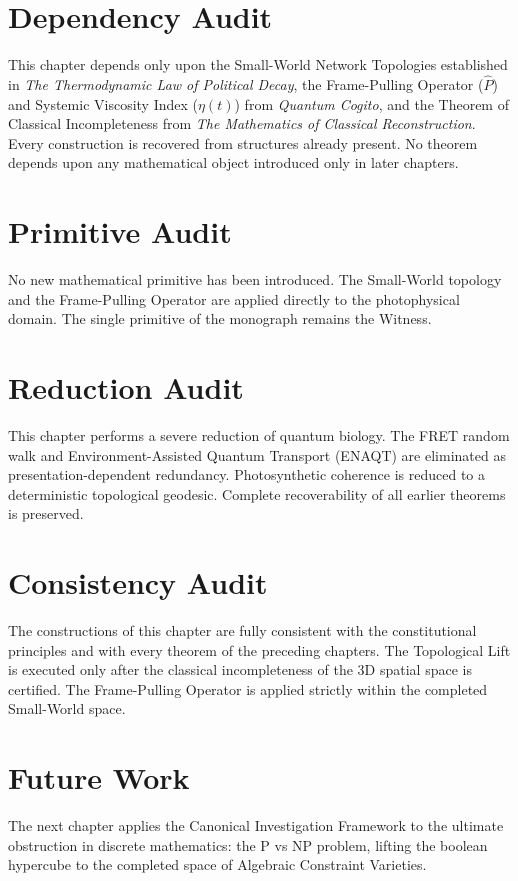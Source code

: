 \documentclass[11pt,openany]{extbook}
\newenvironment{dependencyaudit}{\section*{Dependency Audit}}{}
\newenvironment{primitiveaudit}{\section*{Primitive Audit}}{}
\newenvironment{reductionaudit}{\section*{Reduction Audit}}{}
\newenvironment{consistencyaudit}{\section*{Consistency Audit}}{}
\newenvironment{futurework}{\section*{Future Work}}{}
\theoremstyle{plain}
\theoremstyle{definition}
\begin{document}
\begin{dependencyaudit}
\noindent This chapter depends only upon the Small-World Network Topologies established in \textit{The Thermodynamic Law of Political Decay}, the Frame-Pulling Operator ($\hat{P}$) and Systemic Viscosity Index ($\eta(t)$) from \textit{Quantum Cogito}, and the Theorem of Classical Incompleteness from \textit{The Mathematics of Classical Reconstruction}. Every construction is recovered from structures already present. No theorem depends upon any mathematical object introduced only in later chapters.
\end{dependencyaudit}

\begin{primitiveaudit}
\noindent No new mathematical primitive has been introduced. The Small-World topology and the Frame-Pulling Operator are applied directly to the photophysical domain. The single primitive of the monograph remains the Witness.
\end{primitiveaudit}

\begin{reductionaudit}
\noindent This chapter performs a severe reduction of quantum biology. The FRET random walk and Environment-Assisted Quantum Transport (ENAQT) are eliminated as presentation-dependent redundancy. Photosynthetic coherence is reduced to a deterministic topological geodesic. Complete recoverability of all earlier theorems is preserved.
\end{reductionaudit}

\begin{consistencyaudit}
\noindent The constructions of this chapter are fully consistent with the constitutional principles and with every theorem of the preceding chapters. The Topological Lift is executed only after the classical incompleteness of the 3D spatial space is certified. The Frame-Pulling Operator is applied strictly within the completed Small-World space.
\end{consistencyaudit}

\begin{futurework}
\noindent The next chapter applies the Canonical Investigation Framework to the ultimate obstruction in discrete mathematics: the P vs NP problem, lifting the boolean hypercube to the completed space of Algebraic Constraint Varieties.
\end{futurework}

\end{document}
